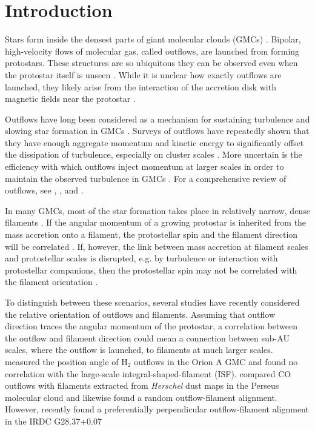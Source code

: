 \documentclass[twocolumn]{aastex63}
\begin{document}
\section{Introduction}
Stars form inside the densest parts of giant molecular clouds (GMCs) \citep{McKee07}. Bipolar, high-velocity flows of molecular gas, called outflows, are launched from forming protostars. These structures are so ubiquitous they can be observed even when the protostar itself is unseen \citep{Kong19}. While it is unclear how exactly outflows are launched, they likely arise from the interaction of the accretion disk with magnetic fields near the protostar \citep[e.g.][]{Konigl00,Shu00,Frank14}.

Outflows have long been considered as a mechanism for sustaining turbulence and slowing star formation in GMCs \citep{Nakamura07,Carroll09,Federrath15}. Surveys of outflows have repeatedly shown that they have enough aggregate momentum and kinetic energy to significantly offset the dissipation of turbulence, especially on cluster scales \citep{Arce10,Nakamura11,Plunkett13,Plunkett15,Li15}. More uncertain is the efficiency with which outflows inject momentum at larger scales in order to maintain the observed turbulence in GMCs \citep{Brunt09,Padoan09,Carroll10}. For a comprehensive review of outflows, see \citet{Arce07}, \citet{Frank14}, and \citet{Bally16}.

In many GMCs, most of the star formation takes place in relatively narrow, dense filaments \citep{Arzoumanian11,Suri19}. If the angular momentum of a growing protostar is inherited from the mass accretion onto a filament, the protostellar spin and the filament direction will be correlated \citep{Bodenheimer95,Andre14,Li19}. If, however, the link between mass accretion at filament scales and protostellar scales is disrupted, e.g. by turbulence or interaction with protostellar companions, then the protostellar spin may not be correlated with the filament orientation \citep{Offner16,Lee17}.


To distinguish between these scenarios, several studies have recently considered the relative orientation of outflows and filaments. Assuming that outflow direction traces the angular momentum of the protostar, a correlation between the outflow and filament direction could mean a connection between sub-AU scales, where the outflow is launched, to filaments at much larger scales. \citet{Davis09} measured the position angle of H$_2$ outflows in the Orion A GMC and found no correlation with the large-scale integral-shaped-filament (ISF). \citet{Stephens17} compared CO outflows with filaments extracted from \emph{Herschel} dust maps in the Perseus molecular cloud and likewise found a random outflow-filament alignment. However, \citet{Kong19} recently found a preferentially perpendicular outflow-filament alignment in the IRDC G28.37+0.07
\end{document}
